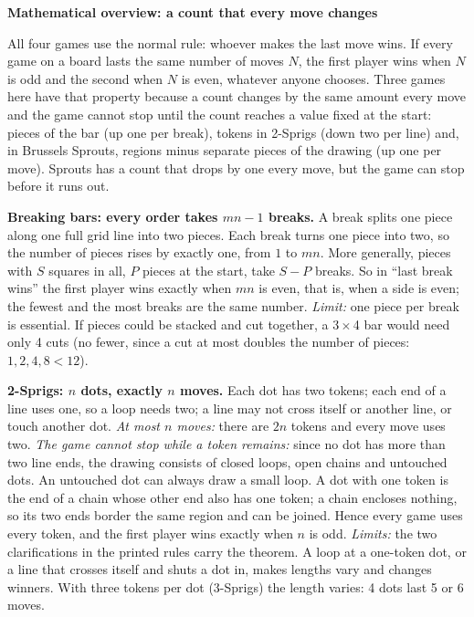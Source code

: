 \documentclass[11pt]{article}
\newcommand{\head}[1]{\par\textbf{\large #1}\par}
\newcommand{\by}{\,$\times$\,}
\begin{document}
\head{Mathematical overview: a count that every move changes}
All four games use the normal rule: whoever makes the last move wins. If every game on a board lasts the same number of moves $N$, the first player wins when $N$ is odd and the second when $N$ is even, whatever anyone chooses. Three games here have that property because a count changes by the same amount every move and the game cannot stop until the count reaches a value fixed at the start: pieces of the bar (up one per break), tokens in 2-Sprigs (down two per line) and, in Brussels Sprouts, regions minus separate pieces of the drawing (up one per move). Sprouts has a count that drops by one every move, but the game can stop before it runs out.

\textbf{Breaking bars: every order takes $mn-1$ breaks.} A break splits one piece along one full grid line into two pieces. Each break turns one piece into two, so the number of pieces rises by exactly one, from $1$ to $mn$. More generally, pieces with $S$ squares in all, $P$ pieces at the start, take $S-P$ breaks. So in ``last break wins'' the first player wins exactly when $mn$ is even, that is, when a side is even; the fewest and the most breaks are the same number. \emph{Limit:} one piece per break is essential. If pieces could be stacked and cut together, a 3\by4 bar would need only 4 cuts (no fewer, since a cut at most doubles the number of pieces: $1,2,4,8<12$).

\textbf{2-Sprigs: $n$ dots, exactly $n$ moves.} Each dot has two tokens; each end of a line uses one, so a loop needs two; a line may not cross itself or another line, or touch another dot. \emph{At most $n$ moves:} there are $2n$ tokens and every move uses two. \emph{The game cannot stop while a token remains:} since no dot has more than two line ends, the drawing consists of closed loops, open chains and untouched dots. An untouched dot can always draw a small loop. A dot with one token is the end of a chain whose other end also has one token; a chain encloses nothing, so its two ends border the same region and can be joined. Hence every game uses every token, and the first player wins exactly when $n$ is odd. \emph{Limits:} the two clarifications in the printed rules carry the theorem. A loop at a one-token dot, or a line that crosses itself and shuts a dot in, makes lengths vary and changes winners. With three tokens per dot (3-Sprigs) the length varies: 4 dots last 5 or 6 moves.
\end{document}
